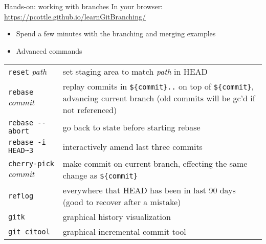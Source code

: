 \documentclass{beamer}
\begin{document}
\begin{frame}{Hands-on: working with branches}
  In your browser: \url{https://pcottle.github.io/learnGitBranching/}
  \begin{itemize}
  \item Spend a few minutes with the branching and merging examples
  \item Advanced commands
  \end{itemize}
  \begin{tabular}{l p{2.8in}}
    \toprule
    \texttt{reset} \textit{path} & set staging area to match \textit{path} in HEAD \\
    \texttt{rebase} \textit{commit} & replay commits in \texttt{\$\{commit\}..} on top of \texttt{\$\{commit\}}, advancing current branch (old commits will be gc'd if not referenced) \\
    \texttt{rebase -{}-abort} & go back to state before starting rebase \\
    \texttt{rebase -i HEAD\~{}3} & interactively amend last three commits \\
    \texttt{cherry-pick} \textit{commit} & make commit on current branch, effecting the same change as \texttt{\$\{commit\}} \\
    \midrule
    \texttt{reflog} & everywhere that HEAD has been in last 90 days (good to recover after a mistake) \\
    \texttt{gitk} & graphical history visualization \\
    \texttt{git citool} & graphical incremental commit tool \\
    \bottomrule
  \end{tabular}  
\end{frame}

\end{document}

